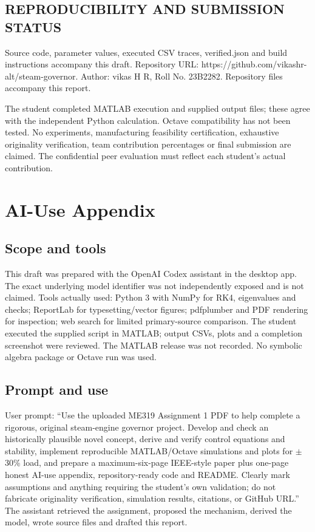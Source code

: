 \documentclass[conference]{IEEEtran}
\begin{document}
\subsection*{REPRODUCIBILITY AND SUBMISSION STATUS}
Source code, parameter values, executed CSV traces, verified.json and build instructions accompany this draft. Repository URL: https://github.com/vikashr-alt/steam-governor. Author: vikas H R, Roll No. 23B2282. Repository files accompany this report.

The student completed MATLAB execution and supplied output files; these agree with the independent Python calculation. Octave compatibility has not been tested. No experiments, manufacturing feasibility certification, exhaustive originality verification, team contribution percentages or final submission are claimed. The confidential peer evaluation must reflect each student's actual contribution.

\clearpage\onecolumn
\section*{AI-Use Appendix}
\subsection*{Scope and tools}
This draft was prepared with the OpenAI Codex assistant in the desktop app. The exact underlying model identifier was not independently exposed and is not claimed. Tools actually used: Python 3 with NumPy for RK4, eigenvalues and checks; ReportLab for typesetting/vector figures; pdfplumber and PDF rendering for inspection; web search for limited primary-source comparison. The student executed the supplied script in MATLAB; output CSVs, plots and a completion screenshot were reviewed. The MATLAB release was not recorded. No symbolic algebra package or Octave run was used.
\subsection*{Prompt and use}
User prompt: ``Use the uploaded ME319 Assignment 1 PDF to help complete a rigorous, original steam-engine governor project. Develop and check an historically plausible novel concept, derive and verify control equations and stability, implement reproducible MATLAB/Octave simulations and plots for \ensuremath{\pm}30\% load, and prepare a maximum-six-page IEEE-style paper plus one-page honest AI-use appendix, repository-ready code and README. Clearly mark assumptions and anything requiring the student's own validation; do not fabricate originality verification, simulation results, citations, or GitHub URL.'' The assistant retrieved the assignment, proposed the mechanism, derived the model, wrote source files and drafted this report.
\end{document}
